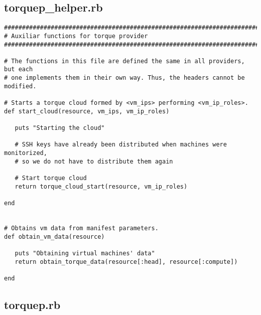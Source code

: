 \subsection{torquep\_helper.rb}


\begin{lstlisting}
################################################################################
# Auxiliar functions for torque provider
################################################################################

# The functions in this file are defined the same in all providers, but each
# one implements them in their own way. Thus, the headers cannot be modified.

# Starts a torque cloud formed by <vm_ips> performing <vm_ip_roles>.
def start_cloud(resource, vm_ips, vm_ip_roles)

   puts "Starting the cloud"
   
   # SSH keys have already been distributed when machines were monitorized,
   # so we do not have to distribute them again
   
   # Start torque cloud
   return torque_cloud_start(resource, vm_ip_roles)

end


# Obtains vm data from manifest parameters.
def obtain_vm_data(resource)

   puts "Obtaining virtual machines' data"
   return obtain_torque_data(resource[:head], resource[:compute])
   
end
\end{lstlisting}


\subsection{torquep.rb}


